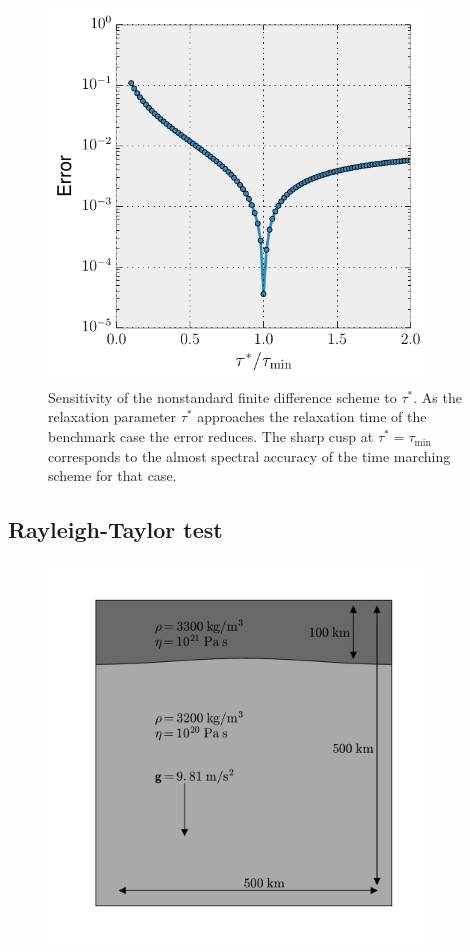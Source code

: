 \documentclass[preprint,12pt,authoryear]{elsarticle}
\begin{document}
\begin{figure}
\includegraphics[width=0.9\textwidth]{figures/tau_sensitivity.pdf}
\caption{Sensitivity of the nonstandard finite difference scheme to $\tau^*$. As the relaxation parameter $\tau^*$ approaches the relaxation time of the benchmark case the error reduces. The sharp cusp at $\tau^* = \tau_\mathrm{min}$ corresponds to the almost spectral accuracy of the time marching scheme for that case.}
\label{fig:tau_sensitivity}
\end{figure}

\subsection{Rayleigh-Taylor test}
\label{sec:rayleigh_taylor}

\begin{figure}
\includegraphics[width=0.9\textwidth]{figures/rayleigh_taylor_setup.pdf}
\caption{}
\label{fig:rayleigh_taylor}
\end{figure}
\end{document}
